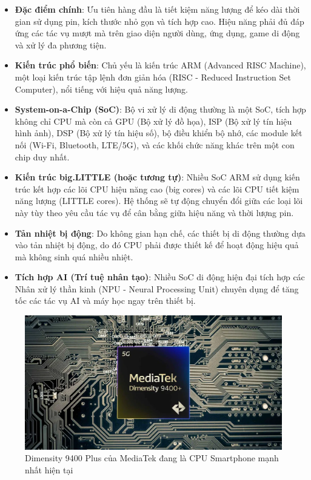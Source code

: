 \begin{itemize}
    \item \textbf{Đặc điểm chính}: Ưu tiên hàng đầu là tiết kiệm năng lượng để kéo dài thời gian sử dụng pin, kích thước nhỏ gọn và tích hợp cao. Hiệu năng phải đủ đáp ứng các tác vụ mượt mà trên giao diện người dùng, ứng dụng, game di động và xử lý đa phương tiện.
    
    \item \textbf{Kiến trúc phổ biến}: Chủ yếu là kiến trúc ARM (Advanced RISC Machine), một loại kiến trúc tập lệnh đơn giản hóa (RISC - Reduced Instruction Set Computer), nổi tiếng với hiệu quả năng lượng.
    
    \item \textbf{System-on-a-Chip (SoC)}: Bộ vi xử lý di động thường là một SoC, tích hợp không chỉ CPU mà còn cả GPU (Bộ xử lý đồ họa), ISP (Bộ xử lý tín hiệu hình ảnh), DSP (Bộ xử lý tín hiệu số), bộ điều khiển bộ nhớ, các module kết nối (Wi-Fi, Bluetooth, LTE/5G), và các khối chức năng khác trên một con chip duy nhất.
    
    \item \textbf{Kiến trúc big.LITTLE (hoặc tương tự)}: Nhiều SoC ARM sử dụng kiến trúc kết hợp các lõi CPU hiệu năng cao (big cores) và các lõi CPU tiết kiệm năng lượng (LITTLE cores). Hệ thống sẽ tự động chuyển đổi giữa các loại lõi này tùy theo yêu cầu tác vụ để cân bằng giữa hiệu năng và thời lượng pin.
    
    \item \textbf{Tản nhiệt bị động}: Do không gian hạn chế, các thiết bị di động thường dựa vào tản nhiệt bị động, do đó CPU phải được thiết kế để hoạt động hiệu quả mà không sinh quá nhiều nhiệt.
    
    \item \textbf{Tích hợp AI (Trí tuệ nhân tạo)}: Nhiều SoC di động hiện đại tích hợp các Nhân xử lý thần kinh (NPU - Neural Processing Unit) chuyên dụng để tăng tốc các tác vụ AI và máy học ngay trên thiết bị.
\end{itemize}

\begin{figure}[H]
    \centering
    \includegraphics[width=0.9\linewidth]{img/cpu_mobile.png}
    \caption{Dimensity 9400 Plus của MediaTek đang là CPU Smartphone mạnh nhất hiện tại}
\end{figure}

